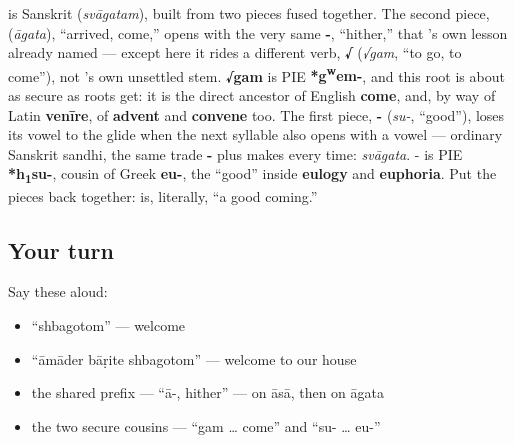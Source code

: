 \begin{cousinweb}
\textbf{} is Sanskrit \textbf{} (\emph{svāgatam}), built from two pieces fused together. The second piece, \textbf{} (\emph{āgata}), \textquotedblleft{}arrived, come,\textquotedblright{} opens with the very same \textbf{-}, \textquotedblleft{}hither,\textquotedblright{} that 's own lesson already named — except here it rides a different verb, \textbf{√} (\emph{√gam}, \textquotedblleft{}to go, to come\textquotedblright{}), not 's own unsettled stem. \textbf{√gam} is PIE \textbf{*g\textsuperscript{w}em-}, and this root is about as secure as roots get: it is the direct ancestor of English \textbf{come}, and, by way of Latin \textbf{venīre}, of \textbf{advent} and \textbf{convene} too. The first piece, \textbf{-} (\emph{su-}, \textquotedblleft{}good\textquotedblright{}), loses its vowel to the glide \textbf{} when the next syllable also opens with a vowel — ordinary Sanskrit sandhi, the same trade \textbf{-} plus \textbf{} makes every time: \emph{svāgata}. - is PIE \textbf{*h\textsubscript{1}su-}, cousin of Greek \textbf{eu-}, the \textquotedblleft{}good\textquotedblright{} inside \textbf{eulogy} and \textbf{euphoria}. Put the pieces back together:  is, literally, \textquotedblleft{}a good coming.\textquotedblright{}
\end{cousinweb}

\subsection*{Your turn}
Say these aloud:

\begin{itemize}
\raggedright
  \item \textquotedblleft{}shbagotom\textquotedblright{} — welcome
  \item \textquotedblleft{}āmāder bāṛite shbagotom\textquotedblright{} — welcome to our house
  \item the shared prefix — \textquotedblleft{}ā-, hither\textquotedblright{} — on āsā, then on āgata
  \item the two secure cousins — \textquotedblleft{}gam … come\textquotedblright{} and \textquotedblleft{}su- … eu-\textquotedblright{}
\end{itemize}

